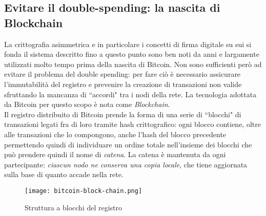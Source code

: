 	\subsection{Evitare il double-spending: la nascita di Blockchain}
		La crittografia asimmetrica e in particolare i concetti di firma digitale su sui si fonda il sistema descritto fino a questo punto sono ben noti da anni e largamente utilizzati molto tempo prima della nascita di Bitcoin. Non sono sufficienti però ad evitare il problema del double spending: per fare ciò è necessario assicurare l'immutabilità del registro e prevenire la creazione di transazioni non valide sfruttando la mancanza di ``accordi" tra i nodi della rete. La tecnologia adottata da Bitcoin per questo scopo è nota come \emph{Blockchain}. \\
		Il registro distribuito di Bitcoin prende la forma di una serie di ``blocchi" di transazioni legati fra di loro tramite hash crittografico: ogni blocco contiene, oltre alle transazioni che lo compongono, anche l'hash del blocco precedente permettendo quindi di individuare un ordine totale nell'insieme dei blocchi che può prendere quindi il nome di \emph{catena}. La catena è mantenuta da ogni partecipante: \emph{ciascun nodo ne conserva una copia locale}, che tiene aggiornata sulla base di quanto accade nella rete.
		\begin{figure}[ht]
			\centering
			\texttt{[image: bitcoin-block-chain.png]}
			\caption{Struttura a blocchi del registro}
			\label{fig:bitcoin_chain}
		\end{figure}
